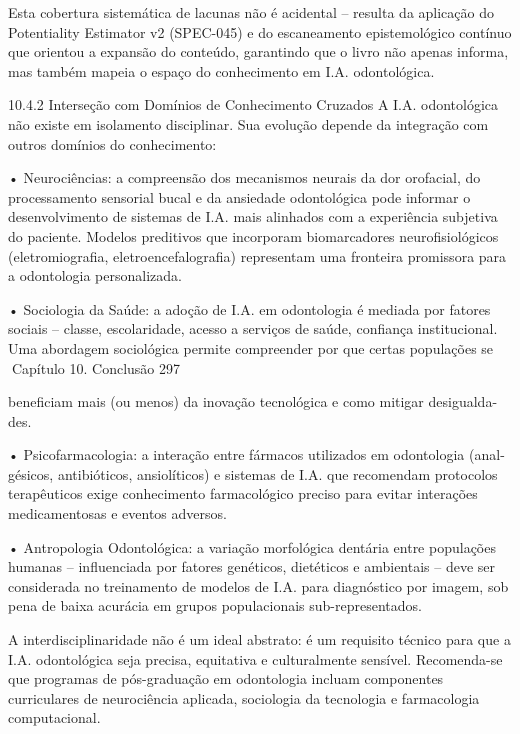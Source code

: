         Esta cobertura sistemática de lacunas não é acidental – resulta da aplicação
do Potentiality Estimator v2 (SPEC-045) e do escaneamento epistemológico contínuo
que orientou a expansão do conteúdo, garantindo que o livro não apenas informa, mas
também mapeia o espaço do conhecimento em I.A. odontológica.

10.4.2     Interseção com Domínios de Conhecimento Cruzados
A I.A. odontológica não existe em isolamento disciplinar. Sua evolução depende da
integração com outros domínios do conhecimento:

   • Neurociências: a compreensão dos mecanismos neurais da dor orofacial, do
     processamento sensorial bucal e da ansiedade odontológica pode informar o
     desenvolvimento de sistemas de I.A. mais alinhados com a experiência subjetiva
     do paciente. Modelos preditivos que incorporam biomarcadores neurofisiológicos
     (eletromiografia, eletroencefalografia) representam uma fronteira promissora para
     a odontologia personalizada.

   • Sociologia da Saúde: a adoção de I.A. em odontologia é mediada por fatores
     sociais – classe, escolaridade, acesso a serviços de saúde, confiança institucional.
     Uma abordagem sociológica permite compreender por que certas populações se
Capítulo 10. Conclusão                                                               297


      beneficiam mais (ou menos) da inovação tecnológica e como mitigar desigualda-
      des.

   • Psicofarmacologia: a interação entre fármacos utilizados em odontologia (anal-
     gésicos, antibióticos, ansiolíticos) e sistemas de I.A. que recomendam protocolos
     terapêuticos exige conhecimento farmacológico preciso para evitar interações
     medicamentosas e eventos adversos.

   • Antropologia Odontológica: a variação morfológica dentária entre populações
     humanas – influenciada por fatores genéticos, dietéticos e ambientais – deve ser
     considerada no treinamento de modelos de I.A. para diagnóstico por imagem, sob
     pena de baixa acurácia em grupos populacionais sub-representados.

         A interdisciplinaridade não é um ideal abstrato: é um requisito técnico para que
a I.A. odontológica seja precisa, equitativa e culturalmente sensível. Recomenda-se
que programas de pós-graduação em odontologia incluam componentes curriculares
de neurociência aplicada, sociologia da tecnologia e farmacologia computacional.


